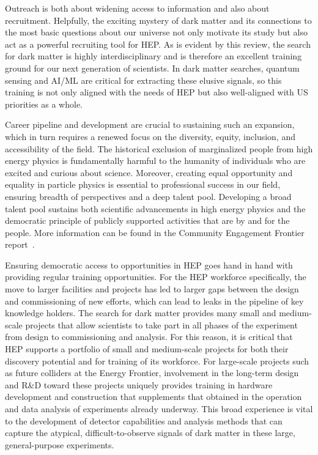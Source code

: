 \documentclass[nofootinbib]{article}
\begin{document}
Outreach is both about widening access to information and also about recruitment. Helpfully, the exciting mystery of dark matter and its connections to the most basic questions about our universe not only motivate its study but also act as a powerful recruiting tool for HEP. As is evident by this review, the search for dark matter is highly interdisciplinary and is therefore an excellent training ground for our next generation of scientists. In dark matter searches, quantum sensing and AI/ML are critical for extracting these elusive signals, so this training is not only aligned with the needs of HEP but also well-aligned with US priorities as a whole. 

Career pipeline and development are crucial to sustaining such an expansion, which in turn requires a renewed focus on the diversity, equity, inclusion, and accessibility of the field. The historical exclusion of marginalized people from high energy physics is fundamentally harmful to the humanity of individuals who are excited and curious about science. Moreover, creating equal opportunity and equality in particle physics is essential to professional success in our field, ensuring breadth of perspectives and a deep talent pool. Developing a broad talent pool sustains both scientific advancements in high energy physics and the democratic principle of publicly supported activities that are by and for the people.  More information can be found in the Community Engagement Frontier report~\cite{CEF-Report}.

Ensuring democratic access to opportunities in HEP goes hand in hand with providing regular training opportunities. For the HEP workforce specifically, the move to larger facilities and projects has led to larger gaps between the design and commissioning of new efforts, which can lead to leaks in the pipeline of key knowledge holders. The search for dark matter provides many small and medium-scale projects that allow scientists to take part in all phases of the experiment from design to commissioning and analysis. For this reason, it is critical that HEP supports a portfolio of small and medium-scale projects for both their discovery potential and for training of its workforce. For large-scale projects such as future colliders at the Energy Frontier, involvement in the long-term design and R\&D toward these projects uniquely provides training in hardware development and construction that supplements that obtained in the operation and data analysis of experiments already underway. This broad experience is vital to the development of detector capabilities and analysis methods that can capture the atypical, difficult-to-observe signals of dark matter in these large, general-purpose experiments.
\end{document}
